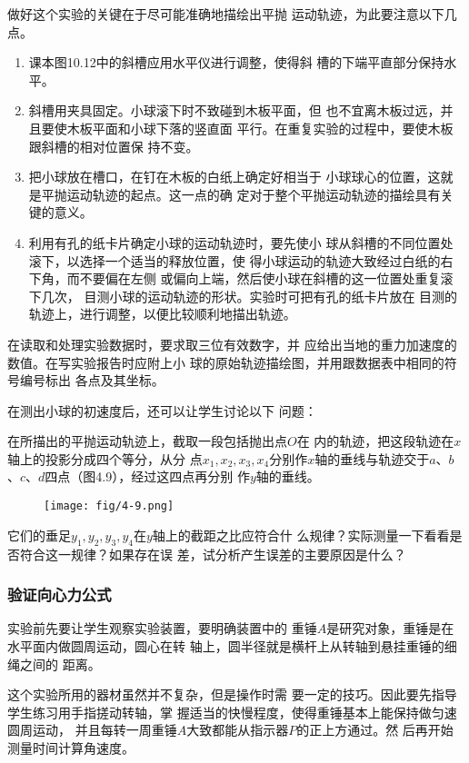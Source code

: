 做好这个实验的关键在于尽可能准确地描绘出平抛
运动轨迹，为此要注意以下几点。
\begin{enumerate}
\item 课本图10.12中的斜槽应用水平仪进行调整，使得斜
槽的下端平直部分保持水平。
\item 斜槽用夹具固定。小球滚下时不致碰到木板平面，但
也不宜离木板过远，并且要使木板平面和小球下落的竖直面
平行。在重复实验的过程中，要使木板跟斜槽的相对位置保
持不变。
\item 把小球放在槽口，在钉在木板的白纸上确定好相当于
小球球心的位置，这就是平抛运动轨迹的起点。这一点的确
定对于整个平抛运动轨迹的描绘具有关键的意义。
\item 利用有孔的纸卡片确定小球的运动轨迹时，要先使小
球从斜槽的不同位置处滚下，以选择一个适当的释放位置，使
得小球运动的轨迹大致经过白纸的右下角，而不要偏在左侧
或偏向上端，然后使小球在斜槽的这一位置处重复滚下几次，
目测小球的运动轨迹的形状。实验时可把有孔的纸卡片放在
目测的轨迹上，进行调整，以便比较顺利地描出轨迹。
\end{enumerate}

在读取和处理实验数据时，要求取三位有效数字，并
应给出当地的重力加速度的数值。在写实验报告时应附上小
球的原始轨迹描绘图，并用跟数据表中相同的符号编号标出
各点及其坐标。

在测出小球的初速度后，还可以让学生讨论以下
问题：

在所描出的平抛运动轨迹上，截取一段包括抛出点$O$在
内的轨迹，把这段轨迹在$x$轴上的投影分成四个等分，从分
点$x_1,x_2,x_3,x_4$分别作$x$轴的垂线与轨迹交于$a$、$b$、$c$、$d$四点（图4.9），经过这四点再分别
作$y$轴的垂线。
\begin{figure}[htp]
    \centering
    \texttt{[image: fig/4-9.png]}
    \caption{}
\end{figure}

它们的垂足$y_1,y_2,y_3,y_4$在$y$轴上的截距之比应符合什
么规律？实际测量一下看看是否符合这一规律？如果存在误
差，试分析产生误差的主要原因是什么？

\subsubsection{验证向心力公式}
实验前先要让学生观察实验装置，要明确装置中的
重锤$A$是研究对象，重锤是在水平面内做圆周运动，圆心在转
轴上，圆半径就是横杆上从转轴到悬挂重锤的细绳之间的
距离。

这个实验所用的器材虽然并不复杂，但是操作时需
要一定的技巧。因此要先指导学生练习用手指搓动转轴，掌
握适当的快慢程度，使得重锤基本上能保持做匀速圆周运动，
并且每转一周重锤$A$大致都能从指示器$P$的正上方通过。然
后再开始测量时间计算角速度。

